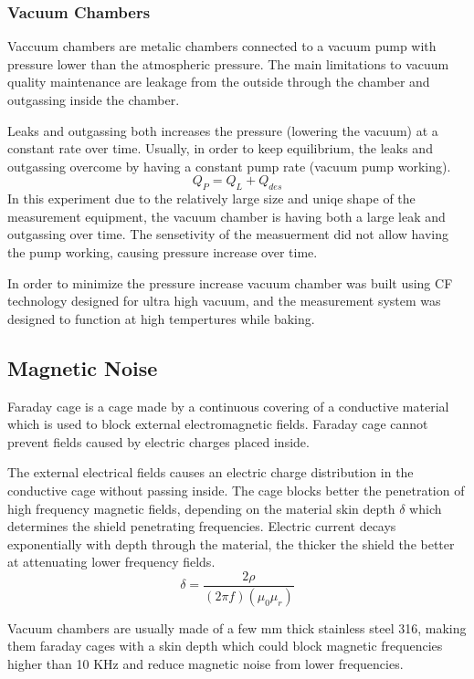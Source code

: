 \documentclass[\main/master.tex]{subfiles}
\begin{document}
\subsubsection{Vacuum Chambers}
Vaccuum chambers are metalic chambers connected to a vacuum pump with pressure lower than the atmospheric pressure. The main limitations to vacuum quality maintenance are leakage from the outside through the chamber and outgassing inside the chamber.
\par
Leaks and outgassing both increases the pressure (lowering the vacuum) at a constant rate over time. Usually, in order to keep equilibrium, the leaks and outgassing overcome by having a constant pump rate (vacuum pump working).   
\begin{equation}
Q_P = Q_L + Q_{des}  \label{eqn:vacuum_equilibrium}
\end{equation}
In this experiment due to the relatively large size and uniqe shape of the measurement equipment, the vacuum chamber is having both a large leak and outgassing over time. The sensetivity of the measuerment did not allow having the pump working, causing pressure increase over time.
\par 
In order to minimize the pressure increase vacuum chamber was built using CF technology designed for ultra high vacuum, and the measurement system was designed to function at high tempertures while baking.
\subsection{Magnetic Noise}

Faraday cage is a cage made by a continuous covering of a conductive material which is used to block external electromagnetic fields. Faraday cage cannot prevent fields caused by electric charges placed inside.
\par
The external electrical fields causes an electric charge distribution in the conductive cage without passing inside. The cage blocks better the penetration of high frequency magnetic fields, depending on the material skin depth $\delta$ which determines the shield penetrating frequencies. Electric current decays exponentially with depth through the material, the thicker the shield the better at attenuating lower frequency fields.
\begin{equation}
\delta = \frac{2\rho}{(2\pi f)(\mu_0\mu_r)}     \label{eqn:mean-free-pass}
\end{equation}
\iffalse
Where $\rho$ is the material electric resistivity, and $\mu_r$ is the relative magnetic permeability.
\fi
Vacuum chambers are usually made of a few mm thick stainless steel 316, making them faraday cages with a skin depth which could block magnetic frequencies higher than 10 KHz and reduce magnetic noise from lower frequencies.
\end{document}
